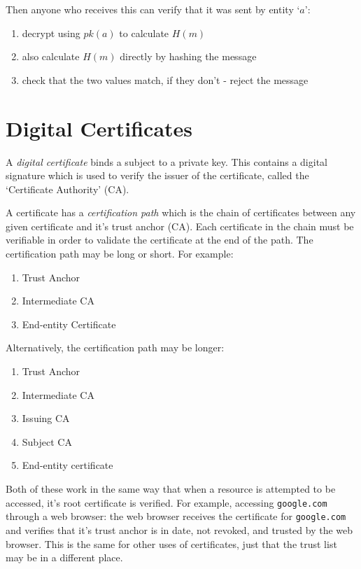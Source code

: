 Then anyone who receives this can verify that it was sent by entity `$a$':
\begin{enumerate}
    \item decrypt using $pk(a)$ to calculate $H(m)$
    \item also calculate $H(m)$ directly by hashing the message
    \item check that the two values match, if they don't - reject the message
\end{enumerate}

\section{Digital Certificates}
A \textit{digital certificate} binds a subject to a private key. This contains a digital signature which is used to verify the issuer of the certificate, called the `Certificate Authority' (CA). 

A certificate has a \textit{certification path} which is the chain of certificates between any given certificate and it's trust anchor (CA). Each certificate in the chain must be verifiable in order to validate the certificate at the end of the path. The certification path may be long or short. For example:
\begin{enumerate}
    \item Trust Anchor
    \item Intermediate CA
    \item End-entity Certificate
\end{enumerate}

Alternatively, the certification path may be longer:
\begin{enumerate}
    \item Trust Anchor
    \item Intermediate CA
    \item Issuing CA
    \item Subject CA
    \item End-entity certificate
\end{enumerate}

Both of these work in the same way that when a resource is attempted to be accessed, it's root certificate is verified. For example, accessing \verb|google.com| through a web browser: the web browser receives the certificate for \verb|google.com| and verifies that it's trust anchor is in date, not revoked, and trusted by the web browser. This is the same for other uses of certificates, just that the trust list may be in a different place.


